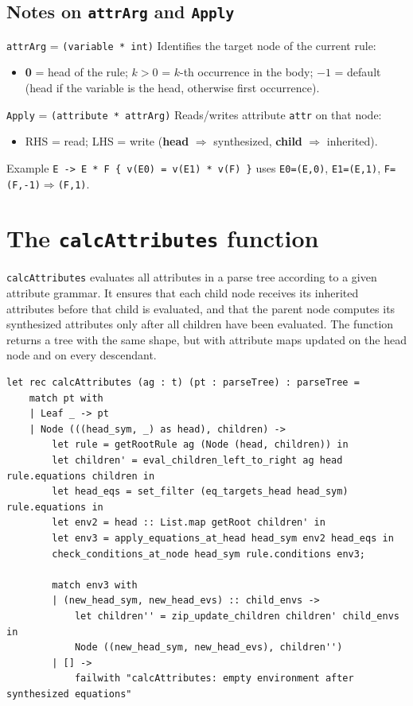 \subsection*{Notes on \texttt{attrArg} and \texttt{Apply}}

\texttt{attrArg} = \texttt{(variable * int)} Identifies the target node of the current rule:
\begin{itemize}
  \item \textbf{0} = head of the rule; \quad \textbf{$k>0$} = $k$-th occurrence in the body; \quad \textbf{$-1$} = default (head if the variable is the head, otherwise first occurrence).
\end{itemize}

\texttt{Apply} = \texttt{(attribute * attrArg)} Reads/writes attribute \texttt{attr} on that node:
\begin{itemize}
  \item RHS = read; \quad LHS = write (\textbf{head} $\Rightarrow$ synthesized, \textbf{child} $\Rightarrow$ inherited).
\end{itemize}

Example
\texttt{E -> E * F \{ v(E0) = v(E1) * v(F) \}} uses \texttt{E0=(E,0)}, \texttt{E1=(E,1)}, \texttt{F=(F,-1)$\Rightarrow$(F,1)}.




\section{The \texttt{calcAttributes} function} 

\texttt{calcAttributes} evaluates all attributes in a parse tree according to a given attribute grammar. 
It ensures that each child node receives its inherited attributes before that child is evaluated, and that the parent node computes its synthesized attributes 
only after all children have been evaluated. 
The function returns a tree with the same shape, but with attribute maps updated on the head node and on every descendant. 


\begin{verbatim}
let rec calcAttributes (ag : t) (pt : parseTree) : parseTree =
    match pt with
    | Leaf _ -> pt
    | Node (((head_sym, _) as head), children) ->
        let rule = getRootRule ag (Node (head, children)) in
        let children' = eval_children_left_to_right ag head rule.equations children in
        let head_eqs = set_filter (eq_targets_head head_sym) rule.equations in
        let env2 = head :: List.map getRoot children' in
        let env3 = apply_equations_at_head head_sym env2 head_eqs in
        check_conditions_at_node head_sym rule.conditions env3;

        match env3 with
        | (new_head_sym, new_head_evs) :: child_envs ->
            let children'' = zip_update_children children' child_envs in
            Node ((new_head_sym, new_head_evs), children'')
        | [] ->
            failwith "calcAttributes: empty environment after synthesized equations"
\end{verbatim}


